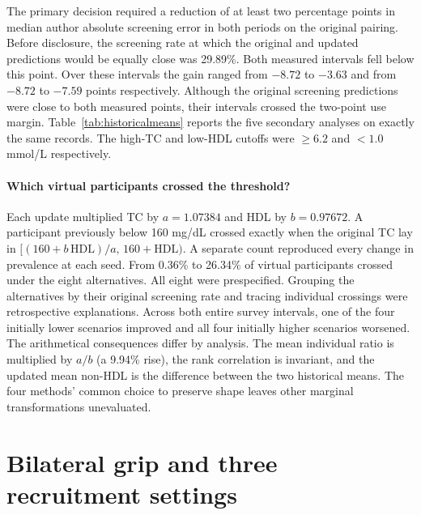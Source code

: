 The primary decision required a reduction of at least two percentage points in median author absolute screening error in both periods on the original pairing. Before disclosure, the screening rate at which the original and updated predictions would be equally close was 29.89\%. Both measured intervals fell below this point. Over these intervals the gain ranged from $-8.72$ to $-3.63$ and from $-8.72$ to $-7.59$ points respectively. Although the original screening predictions were close to both measured points, their intervals crossed the two-point use margin. Table~\ref{tab:historicalmeans} reports the five secondary analyses on exactly the same records. The high-TC and low-HDL cutoffs were $\geq6.2$ and $<1.0$ mmol/L respectively.

\paragraph{Which virtual participants crossed the threshold?}
Each update multiplied TC by $a=1.07384$ and HDL by $b=0.97672$. A participant previously below 160 mg/dL crossed exactly when the original TC lay in $[(160+b\,\mathrm{HDL})/a,\,160+\mathrm{HDL})$. A separate count reproduced every change in prevalence at each seed. From 0.36\% to 26.34\% of virtual participants crossed under the eight alternatives. All eight were prespecified. Grouping the alternatives by their original screening rate and tracing individual crossings were retrospective explanations. Across both entire survey intervals, one of the four initially lower scenarios improved and all four initially higher scenarios worsened. The arithmetical consequences differ by analysis. The mean individual ratio is multiplied by $a/b$ (a 9.94\% rise), the rank correlation is invariant, and the updated mean non-HDL is the difference between the two historical means. The four methods' common choice to preserve shape leaves other marginal transformations unevaluated.

\section{Bilateral grip and three recruitment settings}
\label{app:grip}

